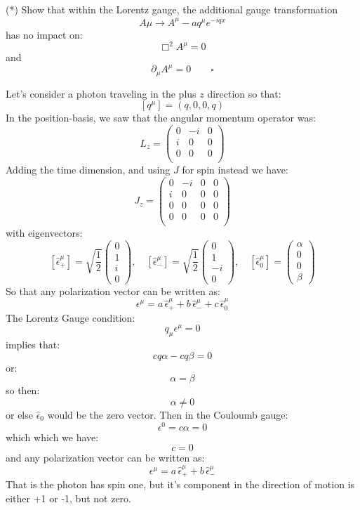 \documentclass[12pt]{article}
\begin{document}
\exercise (*) Show that within the Lorentz gauge, the additional gauge
transformation
$$A\mu \to A^\mu - a q^\mu e^{-iqx}$$
has no impact on:
$$\Box^2 A^\mu = 0$$
and 
$$\partial_\mu A^\mu = 0\qquad \square$$

\noindent
Let's consider a photon traveling in the plus $z$ direction so that:
$$[q^\mu] = (q, 0, 0, q)$$
In the position-basis, we saw that the angular momentum operator was:
$$L_z = \begin{pmatrix}
0 & -i & 0\\ 
i &  0 & 0\\
0 &  0 & 0\\
\end{pmatrix}$$
Adding the time dimension, and using $J$ for spin instead we have:
$$J_z = \begin{pmatrix}
0 & -i & 0 & 0\\ 
i &  0 & 0 & 0\\
0 &  0 & 0 & 0\\
0 &  0 & 0 & 0\\
\end{pmatrix}$$
with eigenvectors:
$$
[\hat{\epsilon}_+^\mu] = \sqrt{\frac{1}{2}}\begin{pmatrix} 0 \\ 1 \\ i \\ 0 \end{pmatrix}, \quad
[\hat{\epsilon}_-^\mu] = \sqrt{\frac{1}{2}}\begin{pmatrix} 0 \\ 1 \\ -i \\ 0 \end{pmatrix}, \quad
[\hat{\epsilon}_0^\mu] = \begin{pmatrix} \alpha \\ 0 \\ 0 \\ \beta \end{pmatrix}
$$
So that any polarization vector can be written as:
$$\epsilon^\mu = a \, \hat{\epsilon}_+^\mu + b \, \hat{\epsilon}_-^\mu + c \, \hat{\epsilon}_0^\mu $$
The Lorentz Gauge condition:
$$q_\mu \epsilon^\mu = 0$$
implies that:
$$c q \alpha - c q \beta = 0$$
or:
$$\alpha = \beta$$
so then:
$$\alpha \neq 0$$
or else $\hat{\epsilon}_0$ would be the zero vector.
Then in the Couloumb gauge:
$$\epsilon^0 = c \alpha = 0$$
which which we have:
$$c = 0$$
and any polarization vector can be written as:
$$\epsilon^\mu = a \, \hat{\epsilon}_+^\mu + b \, \hat{\epsilon}_-^\mu$$
That is the photon has spin one, but it's component in the direction
of motion is either +1 or -1, but not zero.
\end{document}
